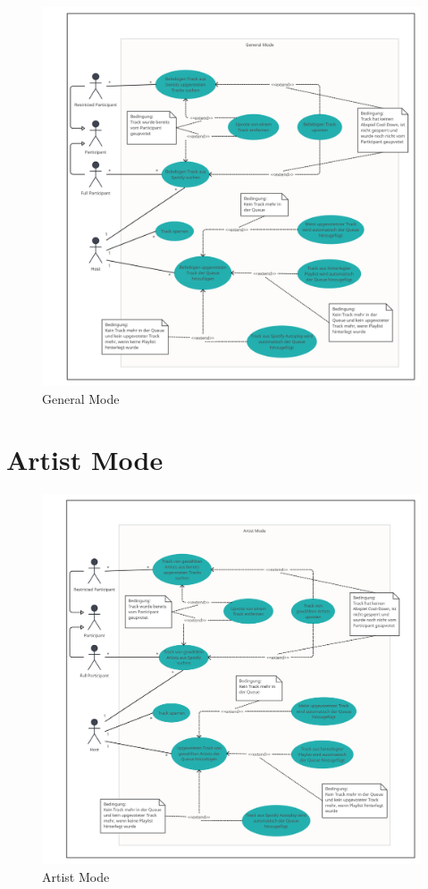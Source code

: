 \documentclass[oneside, ngerman]{sdqtechreport}
\begin{document}
\begin{figure}[h]
    \includegraphics[width = 16cm]{LATEX/Pflichtenheft/GraphicDesigns/Use Case General Mode.png}
    \caption{General Mode}
    \label{fig:Use Case General Mode}
\end{figure}

\newpage

\section{Artist Mode}
\label{sec:Anwendungsfälle:Artist Mode}

\begin{figure}[h]
    \includegraphics[width = 16cm]{LATEX/Pflichtenheft/GraphicDesigns/Use Case Artist Mode.png}
    \caption{Artist Mode}
    \label{fig:Use Case Artist Mode}
\end{figure}
\end{document}
